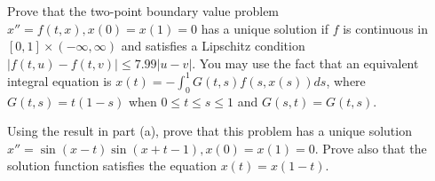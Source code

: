 \begin{alist}
\item Prove that the two-point boundary value problem $x''=f(t,x),
x(0)=x(1)=0$ has a unique solution if $f$ is continuous in
$[0,1]\times (-\infty,\infty)$ and satisfies a Lipschitz condition
$|f(t,u)-f(t,v)|\leq 7.99|u-v|$. You may use the fact that an
equivalent integral equation is $x(t)=-\int_0^1 G(t,s)f(s,x(s))ds$,
where $G(t,s)=t(1-s)$ when $0\leq t\leq s\leq 1$ and $G(s,t)=G(t,s)$.
\item Using the result in part (a), prove that this problem has a
unique solution $x''=\sin(x-t)\sin(x+t-1), x(0)=x(1)=0$. Prove also
that the solution function satisfies the equation $x(t)=x(1-t)$.
\end{alist}
